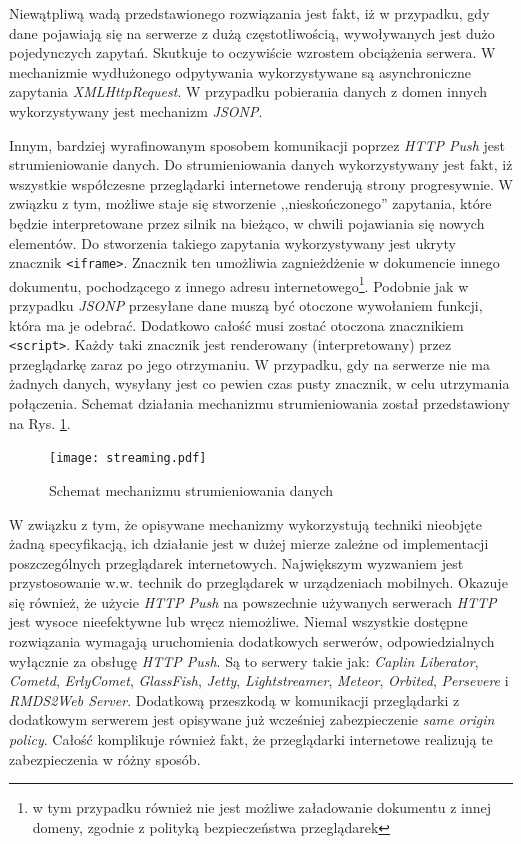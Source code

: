 \documentclass[a4paper,12pt]{article}
\providecommand{\imref}[1]{Rys. \ref{#1}} %
\begin{document}
Niewątpliwą wadą przedstawionego rozwiązania jest fakt, iż w
przypadku, gdy dane pojawiają się na serwerze z dużą częstotliwością,
wywoływanych jest dużo pojedynczych zapytań. Skutkuje to oczywiście
wzrostem obciążenia serwera. W mechanizmie wydłużonego odpytywania
wykorzystywane są asynchroniczne zapytania \emph{XMLHttpRequest}. W
przypadku pobierania danych z domen innych wykorzystywany jest
mechanizm \emph{JSONP}.

Innym, bardziej wyrafinowanym sposobem komunikacji poprzez \emph{HTTP
  Push} jest strumieniowanie danych. Do strumieniowania danych
wykorzystywany jest fakt, iż wszystkie współczesne przeglądarki
internetowe renderują strony progresywnie.
W związku z tym, możliwe staje się stworzenie ,,nieskończonego''
zapytania, które będzie interpretowane przez silnik na bieżąco, w
chwili pojawiania się nowych elementów. Do stworzenia takiego
zapytania wykorzystywany jest ukryty znacznik
\texttt{<iframe>}. Znacznik ten umożliwia zagnieżdżenie w dokumencie
innego dokumentu, pochodzącego z innego adresu
internetowego\footnote{w tym przypadku również nie jest możliwe
  załadowanie dokumentu z innej domeny, zgodnie z polityką
  bezpieczeństwa przeglądarek}. Podobnie jak w przypadku \emph{JSONP}
przesyłane dane muszą być otoczone wywołaniem funkcji, która ma je
odebrać. Dodatkowo całość musi zostać otoczona znacznikiem
\texttt{<script>}. Każdy taki znacznik jest renderowany
(interpretowany) przez przeglądarkę zaraz po jego otrzymaniu. W
przypadku, gdy na serwerze nie ma żadnych danych, wysyłany jest co
pewien czas pusty znacznik, w celu utrzymania połączenia. Schemat
działania mechanizmu strumieniowania został przedstawiony na
\imref{streaming}.

\begin{figure}[ht]
  \begin{center}
    \texttt{[image: streaming.pdf]}
  \end{center}
  \caption{Schemat mechanizmu strumieniowania danych}
  \label{streaming}
\end{figure}

W związku z tym, że opisywane mechanizmy wykorzystują techniki
nieobjęte żadną specyfikacją, ich działanie jest w dużej mierze
zależne od implementacji poszczególnych przeglądarek
internetowych. Największym wyzwaniem jest przystosowanie w.w. technik
do przeglądarek w urządzeniach mobilnych. Okazuje się również, że
użycie \emph{HTTP Push} na powszechnie używanych serwerach \emph{HTTP}
jest wysoce nieefektywne lub wręcz niemożliwe. Niemal wszystkie
dostępne rozwiązania wymagają uruchomienia dodatkowych serwerów,
odpowiedzialnych wyłącznie za obsługę \emph{HTTP Push}. Są to serwery
takie jak: \emph{Caplin Liberator}, \emph{Cometd}, \emph{ErlyComet},
\emph{GlassFish}, \emph{Jetty}, \emph{Lightstreamer}, \emph{Meteor},
\emph{Orbited}, \emph{Persevere} i \emph{RMDS2Web
  Server}\cite{cometmaturity}. Dodatkową przeszkodą w komunikacji
przeglądarki z dodatkowym serwerem jest opisywane już wcześniej
zabezpieczenie \emph{same origin policy}. Całość komplikuje również
fakt, że przeglądarki internetowe realizują te zabezpieczenia w różny
sposób\cite{xssinfo}.
\end{document}
